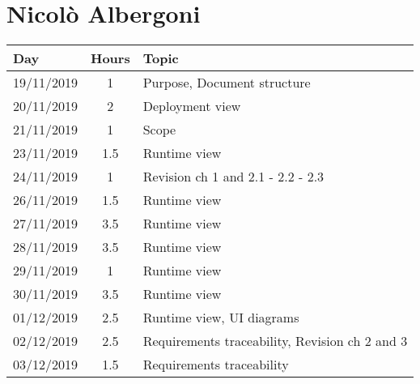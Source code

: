 \section{Nicolò Albergoni}
\begin{table}[H]
  \centering
  \begin{tabularx}{\textwidth}{ |l|c|X| }
      \hline
      Day & Hours & Topic \\
      \hline
      19/11/2019 & 1 & Purpose, Document structure \\								
      \hline
      20/11/2019 & 2 & Deployment view \\
      \hline
      21/11/2019 & 1 & Scope \\
      \hline								
      23/11/2019 & 1.5 &  Runtime view \\									
      \hline
      24/11/2019 & 1 & Revision ch 1 and 2.1 - 2.2 - 2.3 \\									
      \hline
      26/11/2019 & 1.5 & Runtime view \\									
      \hline
      27/11/2019 & 3.5 & Runtime view \\									
      \hline
      28/11/2019 & 3.5 & Runtime view \\
      \hline
      29/11/2019 & 1 & Runtime view \\									
      \hline
      30/11/2019 & 3.5 & Runtime view \\									
      \hline
      01/12/2019 & 2.5 & Runtime view, UI diagrams \\									
      \hline
      02/12/2019 & 2.5 & Requirements traceability, Revision ch 2 and 3\\									
      \hline
      03/12/2019 & 1.5 & Requirements traceability \\						
      \hline        							
  \end{tabularx}
\end{table}

